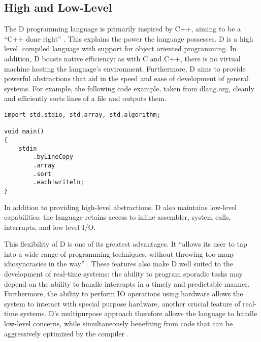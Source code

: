 \subsection{High and Low-Level}
The D programming language is primarily inspired by C++, aiming to be a ``C++ done
right'' 
\cite{qznc-tutorial}. 
This explains the power the language possesses. D is a high level, compiled 
language with support for object oriented programming. In addition, D boasts 
native efficiency: as with C and C++, there is no virtual 
machine hosting the language's environment.
Furthermore, D aims to provide
powerful abstractions that aid in the speed and ease of development of general systems. 
For example, the following code example, taken from dlang.org, cleanly and efficiently 
sorts lines of a file and outputs them. 
\begin{lstlisting}[basicstyle=\small]
import std.stdio, std.array, std.algorithm;

void main()
{
    stdin
        .byLineCopy
        .array
        .sort
        .each!writeln;
}
\end{lstlisting}
In addition to providing high-level abstractions, D also maintains low-level 
capabilities: the language retains access to inline assembler, system calls, 
interrupts, and low level I/O.
\par\bigskip\noindent
This flexibility of D is one of its greatest advantages. It ``allows its user to tap 
into a wide range of programming techniques, without throwing too many 
idiosyncrasies in the way'' \cite{ddili-book}. 
These features also make D well suited to the development of real-time systems: 
the ability to program sporadic tasks may depend on the ability to handle 
interrupts in a timely and predictable manner.
Furthermore, the ability to perform IO operations using hardware allows the
system to interact with special purpose hardware, another crucial feature of
real-time systems.
D's multipurpose approach therefore allows the language to handle low-level concerns,
while simultaneously benefiting from code that can be aggressively optimized by the
compiler \cite{dlang-overview}.

